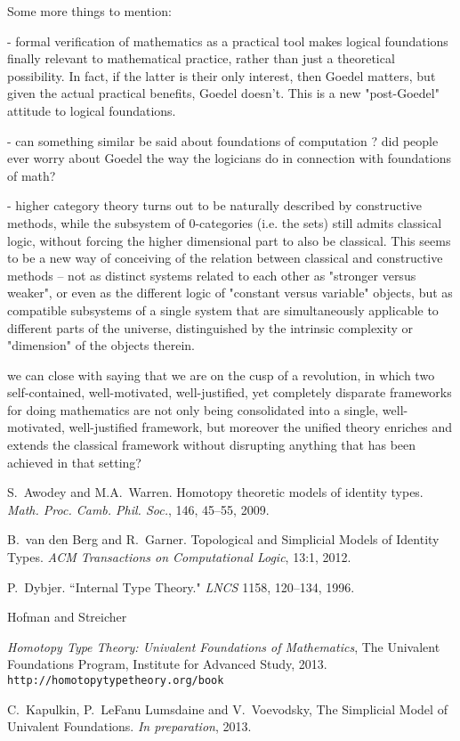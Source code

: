 \documentclass[11pt]{article}
\theoremstyle{remark}
\theoremstyle{definition}
\begin{document}
Some more things to mention:

- formal verification of mathematics as a practical tool makes logical foundations finally relevant to mathematical practice, rather than just a theoretical possibility.  In fact, if the latter is their only interest, then Goedel matters, but given the actual practical benefits, Goedel doesn't. This is a new "post-Goedel" attitude to logical foundations. 

- can something similar be said about foundations of computation ?  did people ever worry about Goedel the way the logicians do in connection with foundations of math?

- higher category theory turns out to be naturally described by constructive methods, while the subsystem of 0-categories (i.e. the sets) still admits classical logic, without forcing the higher dimensional part to also be classical.  This seems to be a new way of conceiving of the relation between classical and constructive methods -- not as distinct systems related to each other as "stronger versus weaker", or even as the different  logic of "constant versus variable" objects, but as compatible subsystems of a single system that are simultaneously applicable to different parts of the universe, distinguished by the intrinsic complexity or "dimension" of the objects therein.

we can close with saying that we are on the cusp of a revolution, in which two self-contained, well-motivated, well-justified, yet completely disparate frameworks for doing mathematics are not only being consolidated into a single, well-motivated, well-justified framework, but moreover the unified theory enriches and extends the classical framework without disrupting anything that has been achieved in that setting?

\begin{thebibliography}{300}

S.~Awodey and M.A.~Warren. Homotopy theoretic models of identity types. \emph{Math. Proc. Camb. Phil. Soc.}, 146, 45--55, 2009.

B.~van den Berg and R.~Garner. Topological and Simplicial Models of Identity Types. \emph{ACM Transactions on Computational Logic}, 13:1, 2012.

P.~Dybjer. ``Internal Type Theory." \emph{LNCS} 1158, 120--134, 1996.

 Hofman and Streicher 

\emph{Homotopy Type Theory: Univalent Foundations of Mathematics}, The Univalent Foundations Program, Institute for Advanced Study, 2013. {\tt http://homotopytypetheory.org/book}

C.~Kapulkin, P.~LeFanu Lumsdaine and V.~Voevodsky, The Simplicial Model of Univalent Foundations. \emph{In preparation}, 2013.

%
\end{thebibliography}

\end{document}
